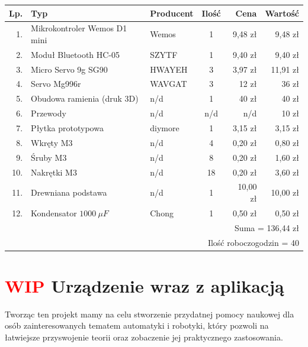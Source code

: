 \documentclass[11pt,titlepage,a4paper]{article}
\begin{document}
\begin{center}
    \begin{tabular}{|r|l|l|c|r|r|}
        \hline
        Lp. & Typ                          & Producent & Ilość & Cena     & Wartość  \\
        \hline
        1.  & Mikrokontroler Wemos D1 mini & Wemos     & 1     & 9,48 zł  & 9,48 zł  \\
        2.  & Moduł Bluetooth HC-05        & SZYTF     & 1     & 9,40 zł  & 9,40 zł  \\
        3.  & Micro Servo 9g SG90          & HWAYEH    & 3     & 3,97 zł  & 11,91 zł \\
        4.  & Servo Mg996r                 & WAVGAT    & 3     & 12 zł    & 36 zł    \\
        5.  & Obudowa ramienia (druk 3D)   & n/d       & 1     & 40 zł    & 40 zł    \\
        6.  & Przewody                     & n/d       & n/d   & n/d      & 10 zł    \\
        7.  & Płytka prototypowa           & diymore   & 1     & 3,15 zł  & 3,15 zł  \\
        8.  & Wkręty M3                    & n/d       & 4     & 0,20 zł  & 0,80 zł  \\
        9.  & Śruby M3                     & n/d       & 8     & 0,20 zł  & 1,60 zł  \\
        10. & Nakrętki M3                  & n/d       & 18    & 0,20 zł  & 3,60 zł  \\
        11. & Drewniana podstawa           & n/d       & 1     & 10,00 zł & 10,00 zł \\
        12. & Kondensator $1000\ \mu F$    & Chong     & 1     & 0,50 zł  & 0,50 zł  \\
        \hline
        \multicolumn{6}{|r|}{Suma = 136,44 zł}                                       \\
        \hline
        \multicolumn{6}{|r|}{Ilość roboczogodzin = 40}                               \\
        \hline
    \end{tabular}
\end{center}

\newpage

\section{\textcolor{red}{WIP} Urządzenie wraz z aplikacją}

Tworząc ten projekt mamy na celu stworzenie przydatnej pomocy naukowej dla osób zainteresowanych tematem automatyki i robotyki, który pozwoli na łatwiejsze przyswojenie teorii oraz zobaczenie jej praktycznego zastosowania.
\end{document}
